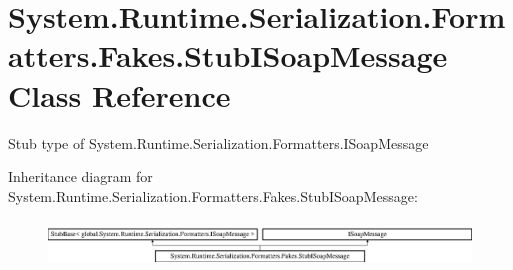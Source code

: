 \hypertarget{class_system_1_1_runtime_1_1_serialization_1_1_formatters_1_1_fakes_1_1_stub_i_soap_message}{\section{System.\-Runtime.\-Serialization.\-Formatters.\-Fakes.\-Stub\-I\-Soap\-Message Class Reference}
\label{class_system_1_1_runtime_1_1_serialization_1_1_formatters_1_1_fakes_1_1_stub_i_soap_message}
}


Stub type of System.\-Runtime.\-Serialization.\-Formatters.\-I\-Soap\-Message 


Inheritance diagram for System.\-Runtime.\-Serialization.\-Formatters.\-Fakes.\-Stub\-I\-Soap\-Message\-:\begin{figure}[H]
\begin{center}
\leavevmode
\includegraphics[height=1.252796cm]{class_system_1_1_runtime_1_1_serialization_1_1_formatters_1_1_fakes_1_1_stub_i_soap_message}
\end{center}
\end{figure}
